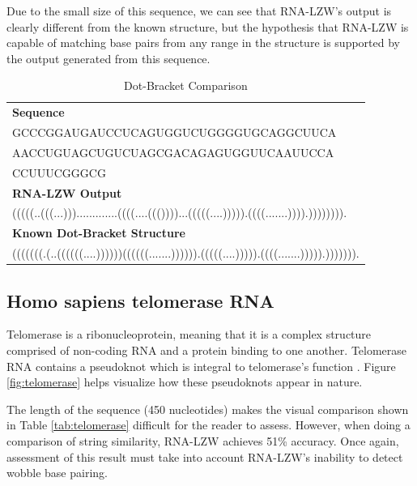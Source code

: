 \documentclass[sigconf]{acmart}
\begin{document}
Due to the small size of this sequence, we can see that RNA-LZW's output is clearly different from the known structure, but the hypothesis that RNA-LZW is capable of matching base pairs from any range in the structure is supported by the output generated from this sequence. 

\begin{table}
  \caption{Dot-Bracket Comparison}
  \label{tab:tRNA}
  \begin{tabular}{l}
    \textbf{Sequence}\\
    GCCCGGAUGAUCCUCAGUGGUCUGGGGUGCAGGCUUCA\\
    AACCUGUAGCUGUCUAGCGACAGAGUGGUUCAAUUCCA\\
    CCUUUCGGGCG\\
    \midrule
    \textbf{RNA-LZW Output}\\
	(((((..(((...))).............((((....((())))...(((((....))))).((((.......)))).)))))))).\\
    \midrule 
    \textbf{Known Dot-Bracket Structure}\\
    (((((((.(..((((((....))))))((((((.......)))))).(((((....))))).((((.......))))).))))))).\\
\end{tabular}
\end{table}


\subsection{Homo sapiens telomerase RNA}

Telomerase is a ribonucleoprotein, meaning that it is a complex structure comprised of non-coding RNA and a protein binding to one another. Telomerase RNA contains a pseudoknot which is integral to telomerase's function \cite{ncbi}.  Figure \ref{fig:telomerase} helps visualize how these pseudoknots appear in nature.

The length of the sequence (450 nucleotides) makes the visual comparison shown in Table \ref{tab:telomerase} difficult for the reader to assess. However, when doing a comparison of string similarity, RNA-LZW achieves 51\% accuracy. Once again, assessment of this result must take into account RNA-LZW's inability to detect wobble base pairing. 
\end{document}
